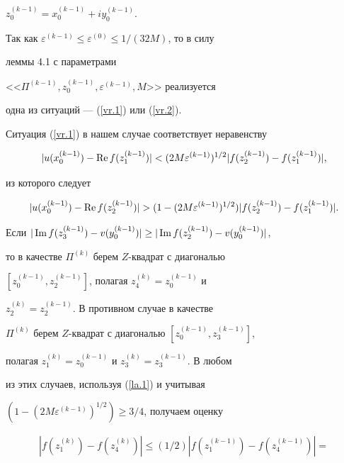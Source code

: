\begin{pf}
$z_0^{(k-1)} = x_0^{(k-1)} + iy_0^{(k-1)}$. 


Так как $\varepsilon^{(k-1)} \leq \varepsilon^{(0)} \leq 1/(32M)$, то в силу 


леммы 4.1 с параметрами 


<<$\Pi^{(k-1)}, z_0^{(k-1)}, \varepsilon^{(k-1)}, M$>> реализуется 


одна из ситуаций --- (\ref{vr.1}) или (\ref{vr.2}).


 


Ситуация (\ref{vr.1}) в нашем случае соответствует неравенству 


$$


|u(x_0^{(k-1)}) - \re f(z_1^{(k-1)})| < 


(2M\varepsilon^{(k-1)})^{1/2} |f(z_2^{(k-1)}) - f(z_1^{(k-1)})|,


$$ 


из которого следует


\begin{equation}


\label{la.1}


|u(x_0^{(k-1)}) - \re f(z_2^{(k-1)})| > 


(1 - (2M\varepsilon^{(k-1)})^{1/2}) |f(z_2^{(k-1)}) - f(z_1^{(k-1)})|.


\end{equation}


Если $|\im f(z_3^{(k-1)}) - v(y_0^{(k-1)})| \geq 


|\im f(z_2^{(k-1)}) - v(y_0^{(k-1)})| $, 


то в качестве $\Pi^{(k)}$ берем $Z$-квадрат с диагональю 


$[z_0^{(k-1)}, z_2^{(k-1)}]$, полагая $z_4^{(k)} = z_0^{(k-1)}$ и 


$z_2^{(k)} = z_2^{(k-1)}$. В противном случае в качестве 


$\Pi^{(k)}$ берем $Z$-квадрат с диагональю $[z_0^{(k-1)}, z_3^{(k-1)}]$, 


полагая $z_1^{(k)} = z_0^{(k-1)}$ и $z_3^{(k)} = z_3^{(k-1)}$. В любом 


из этих случаев, используя (\ref{la.1}) и учитывая


$(1 - (2M\varepsilon^{(k-1)})^{1/2}) \geq 3/4$, получаем оценку


\begin{multline*}


|f(z_1^{(k)})-f(z_4^{(k)})| \leq (1/2) |f(z_1^{(k-1)}) - f(z_4^{(k-1)})| =\\



\end{multline*}
\end{pf}
